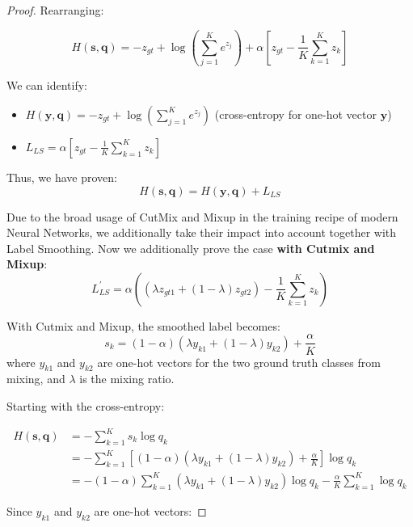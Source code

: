 \begin{proof}
Rearranging:

\begin{equation}
H(\mathbf{s}, \mathbf{q}) = -z_{gt} + \log(\sum_{j=1}^{K} e^{z_j}) + \alpha[z_{gt} - \frac{1}{K}\sum_{k=1}^{K} z_k]
\end{equation}

We can identify:
\begin{itemize}
    \item $H(\mathbf{y}, \mathbf{q}) = -z_{gt} + \log(\sum_{j=1}^{K} e^{z_j})$ (cross-entropy for one-hot vector $\mathbf{y}$)
    \item $L_{\textit{LS}} = \alpha[z_{gt} - \frac{1}{K}\sum_{k=1}^{K} z_k]$
\end{itemize}

Thus, we have proven:
\begin{equation}
H(\mathbf{s}, \mathbf{q}) = H(\mathbf{y}, \mathbf{q}) + L_{\textit{LS}}
\end{equation}

Due to the broad usage of CutMix and Mixup in the training recipe of modern Neural Networks, we additionally take their impact into account together with Label Smoothing. Now we additionally prove the case \textbf{with Cutmix and Mixup}:
\begin{equation}
L^{\prime}_{\textit{LS}} = \alpha (\left(\lambda z_{gt1} + (1 - \lambda) z_{gt2}\right) - \frac{1}{K} \sum_{k=1}^K z_k)
\end{equation}

With Cutmix and Mixup, the smoothed label becomes:
\begin{equation}
s_k = (1 - \alpha) (\lambda y_{k1} + (1-\lambda) y_{k2}) + \frac{\alpha}{K}
\end{equation}
where $y_{k1}$ and $y_{k2}$ are one-hot vectors for the two ground truth classes from mixing, and $\lambda$ is the mixing ratio.

Starting with the cross-entropy:

\begin{align}
H(\mathbf{s}, \mathbf{q}) &= -\sum_{k=1}^{K} s_k \log q_k \\
&= -\sum_{k=1}^{K} [(1 - \alpha) (\lambda y_{k1} + (1-\lambda) y_{k2}) + \frac{\alpha}{K}] \log q_k \\
&= -(1 - \alpha)\sum_{k=1}^{K} (\lambda y_{k1} + (1-\lambda) y_{k2}) \log q_k - \frac{\alpha}{K}\sum_{k=1}^{K} \log q_k
\end{align}

Since $y_{k1}$ and $y_{k2}$ are one-hot vectors:


\end{proof}
